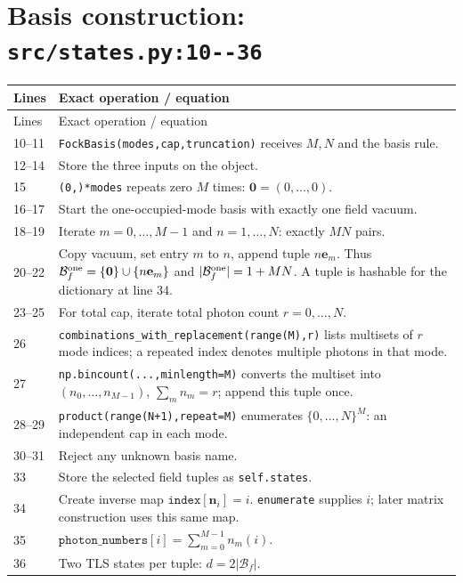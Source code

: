 \documentclass[11pt,a4paper]{article}
\newcommand{\code}[1]{\nolinkurl{#1}}
\newcommand{\Bf}{\mathcal B_f}
\begin{document}
\section{Basis construction: \code{src/states.py:10--36}}

\begin{longtable}{p{}p{}}
\toprule Lines & Exact operation / equation\\\midrule\endfirsthead
\toprule Lines & Exact operation / equation\\\midrule\endhead
10--11 & \code{FockBasis(modes,cap,truncation)} receives $M,N$ and the basis rule.\\
12--14 & Store the three inputs on the object.\\
15 & \code{(0,)*modes} repeats zero $M$ times: $\mathbf0=(0,\ldots,0)$.\\
16--17 & Start the one-occupied-mode basis with exactly one field vacuum.\\
18--19 & Iterate $m=0,\ldots,M-1$ and $n=1,\ldots,N$: exactly $MN$ pairs.\\
20--22 & Copy vacuum, set entry $m$ to $n$, append tuple $n\mathbf e_m$. Thus $\Bf^{\rm one}=\{\mathbf0\}\cup\{n\mathbf e_m\}$ and $|\Bf^{\rm one}|=1+MN$. A tuple is hashable for the dictionary at line 34.\\
23--25 & For total cap, iterate total photon count $r=0,\ldots,N$.\\
26 & \code{combinations_with_replacement(range(M),r)} lists multisets of $r$ mode indices; a repeated index denotes multiple photons in that mode.\\
27 & \code{np.bincount(...,minlength=M)} converts the multiset into $(n_0,\ldots,n_{M-1})$, $\sum_mn_m=r$; append this tuple once.\\
28--29 & \code{product(range(N+1),repeat=M)} enumerates $\{0,\ldots,N\}^M$: an independent cap in each mode.\\
30--31 & Reject any unknown basis name.\\
33 & Store the selected field tuples as \code{self.states}.\\
34 & Create inverse map $\texttt{index}[\mathbf n_i]=i$. \code{enumerate} supplies $i$; later matrix construction uses this same map.\\
35 & $\texttt{photon\_numbers}[i]=\sum_{m=0}^{M-1}n_m(i)$.\\
36 & Two TLS states per tuple: $d=2|\Bf|$.\\
\bottomrule
\end{longtable}
\end{document}
